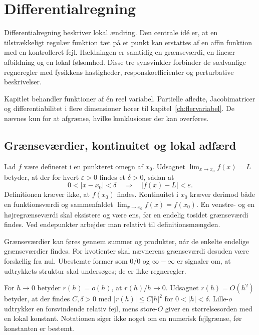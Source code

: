 \chapter{Differentialregning}
\label{ch:diff}
Differentialregning beskriver lokal ændring. Den centrale idé er, at en tilstrækkeligt regulær funktion tæt på et punkt kan erstattes af en affin funktion med en kontrolleret fejl. Hældningen er samtidig en grænseværdi, en lineær afbildning og en lokal følsomhed. Disse tre synsvinkler forbinder de sædvanlige regneregler med fysikkens hastigheder, responskoefficienter og perturbative beskrivelser.

Kapitlet behandler funktioner af én reel variabel. Partielle afledte, Jacobimatricer og differentiabilitet i flere dimensioner hører til kapitel~\ref{ch:flervariabel}. De nævnes kun for at afgrænse, hvilke konklusioner der kan overføres.

\section{Grænseværdier, kontinuitet og lokal adfærd}
\label{sec:graense}
Lad $f$ være defineret i en punkteret omegn af $x_0$. Udsagnet $\lim_{x\to x_0}f(x)=L$ betyder, at der for hvert $\varepsilon>0$ findes et $\delta>0$, sådan at
\[
0<|x-x_0|<\delta\quad\Longrightarrow\quad |f(x)-L|<\varepsilon.
\]
Definitionen kræver ikke, at $f(x_0)$ findes. Kontinuitet i $x_0$ kræver derimod både en funktionsværdi og sammenfaldet $\lim_{x\to x_0}f(x)=f(x_0)$. En venstre- og en højregrænseværdi skal eksistere og være ens, før en endelig tosidet grænseværdi findes. Ved endepunkter arbejder man relativt til definitionsmængden.

Grænseværdier kan føres gennem summer og produkter, når de enkelte endelige grænseværdier findes. For kvotienter skal nævnerens grænseværdi desuden være forskellig fra nul. Ubestemte former som $0/0$ og $\infty-\infty$ er signaler om, at udtrykkets struktur skal undersøges; de er ikke regneregler.

For $h\to0$ betyder $r(h)=o(h)$, at $r(h)/h\to0$. Udsagnet $r(h)=O(h^2)$ betyder, at der findes $C,\delta>0$ med $|r(h)|\le C|h|^2$ for $0<|h|<\delta$. Lille-$o$ udtrykker en forsvindende relativ fejl, mens store-$O$ giver en størrelsesorden med en lokal konstant. Notationen siger ikke noget om en numerisk fejlgrænse, før konstanten er bestemt.

